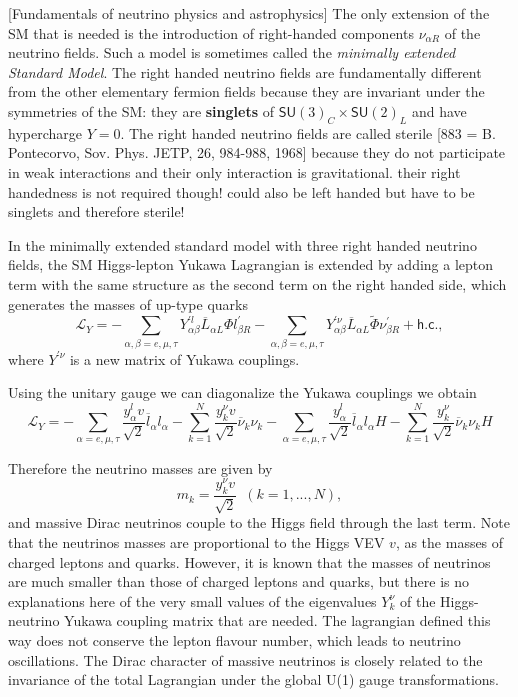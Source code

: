 [Fundamentals of neutrino physics and astrophysics]
The only extension of the SM that is needed is the introduction of right-handed components $\nu_{\alpha R}$ of the neutrino fields. Such a model is sometimes called the \textit{minimally extended Standard Model}. The right handed neutrino fields are fundamentally different from the other elementary fermion fields because they are invariant under the symmetries of the SM: they are \textbf{singlets} of $\textsf{SU}(3)_C\times\textsf{SU}(2)_L$ and have hypercharge $Y=0$. The right handed neutrino fields are called sterile [883 = B. Pontecorvo, Sov. Phys. JETP, 26, 984-988, 1968] because they do not participate in weak interactions and their only interaction is gravitational. their right handedness is not required though! could also be left handed but have to be singlets and therefore sterile!

In the minimally extended standard model with three right handed neutrino fields, the SM Higgs-lepton Yukawa Lagrangian is extended by adding a lepton term with the same structure as the second term on the right handed side, which generates the masses of up-type quarks
\begin{equation}
\mathcal{L}_Y=
-\sum_{\alpha,\beta=e,\mu,\tau} Y_{\alpha\beta}^{\prime l} \overline{L}_{\alpha L}\Phi l_{\beta R}^{\prime}
-\sum_{\alpha,\beta=e,\mu,\tau} Y_{\alpha\beta}^{\prime \nu} \overline{L}_{\alpha L}\tilde{\Phi} \nu_{\beta R}^{\prime}
+\textsf{h.c.},
\end{equation}
where $Y^{\prime \nu}$ is a new matrix of Yukawa couplings.

Using the unitary gauge we can diagonalize the Yukawa couplings we obtain
\begin{equation}
\mathcal{L}_Y=
-\sum_{\alpha=e,\mu,\tau}\frac{y_\alpha^l v}{\sqrt{2}}\overline{l}_\alpha l_\alpha
-\sum_{k=1}^N \frac{y_k^\nu v}{\sqrt{2}}\overline{\nu}_k\nu_k
-\sum_{\alpha=e,\mu,\tau}\frac{y_\alpha^l}{\sqrt{2}}\overline{l}_\alpha l_\alpha H
-\sum_{k=1}^N \frac{y_k^\nu}{\sqrt{2}}\overline{\nu}_k\nu_k H
\end{equation}

Therefore the neutrino masses are given by
\begin{equation}
m_k=\frac{y_k^\nu v}{\sqrt{2}}\,\,\,\left(k=1,...,N\right),
\end{equation}
and massive Dirac neutrinos couple to the Higgs field through the last term. Note that the neutrinos masses are proportional to the Higgs VEV $v$, as the masses of charged leptons and quarks. However, it is known that the masses of neutrinos are much smaller than those of charged leptons and quarks, but there is no explanations here of the very small values of the eigenvalues $Y_k^{\nu}$ of the Higgs-neutrino Yukawa coupling matrix that are needed. The lagrangian defined this way does not conserve the lepton flavour number, which leads to neutrino oscillations. The Dirac character of massive neutrinos is closely related to the invariance of the total Lagrangian under the global U(1) gauge transformations.

